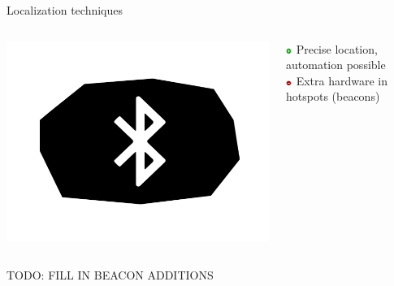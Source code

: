 \documentclass[11pt]{beamer}
\begin{document}
\begin{frame}{Localization techniques}

  \begin{columns}[c]

    \begin{column}{0.2\textwidth}
      \includegraphics[width=\textwidth]{beacon-symbol}
    \end{column}

    \hfill

    \begin{column}{0.8\textwidth}

      \includegraphics[width=0.05\textwidth]{plus} Precise location, automation possible\\
      \includegraphics[width=0.05\textwidth]{minus} Extra hardware in hotspots (beacons)

    \end{column}

  \end{columns}

  TODO: FILL IN BEACON ADDITIONS

\end{frame}
\end{document}
